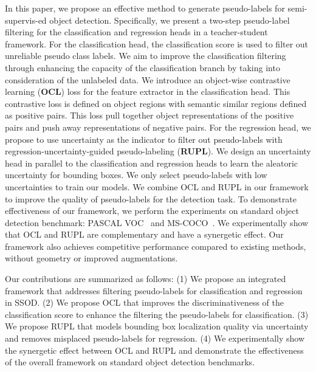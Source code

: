 \documentclass{bmvc2k}
\begin{document}
In this paper, we propose an effective method to generate pseudo-labels for semi-supervis-ed object detection. 
Specifically, we present a two-step pseudo-label filtering for the classification and regression heads in a teacher-student framework. For the classification head, the classification score is used to filter out unreliable pseudo class labels. 
We aim to improve the classification filtering through enhancing the capacity of the classification branch by taking into consideration of the unlabeled data. We introduce an object-wise contrastive learning (\textbf{OCL}) loss for the feature extractor in the classification head. This contrastive loss is defined on object regions with semantic similar regions defined as positive pairs. This loss pull together object representations of the positive pairs and push away representations of negative pairs. 
For the regression head, we propose to use uncertainty as the indicator to filter out pseudo-labels with regression-uncertainty-guided pseudo-labeling (\textbf{RUPL}). We design an uncertainty head in parallel to the classification and regression heads to learn the aleatoric uncertainty for bounding boxes. We only select pseudo-labels with low uncertainties to train our models.
We combine OCL and RUPL in our framework to improve the quality of pseudo-labels for the detection task.
To demonstrate effectiveness of our framework, we perform the experiments on standard object detection benchmark: PASCAL VOC~\cite{voc} and MS-COCO~\cite{mscoco}. We experimentally show that OCL and RUPL are complementary and have a synergetic effect. Our framework also achieves competitive performance compared to existing methods, without geometry or improved augmentations.

Our contributions are summarized as follows: 
(1) We propose an integrated framework that addresses filtering pseudo-labels for classification and regression in SSOD. 
(2) We propose OCL that improves the discriminativeness of the classification score to enhance the filtering the pseudo-labels for classification.
(3) We propose RUPL that models bounding box localization quality via  uncertainty and removes misplaced pseudo-labels for regression.
(4) We experimentally show the synergetic effect between OCL and RUPL and demonstrate the effectiveness of the overall framework on standard object detection benchmarks.
\end{document}
